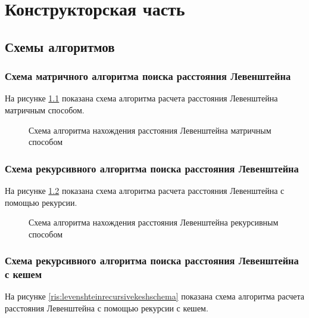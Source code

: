 
\chapter{Конструкторская часть}\label{Konstruct}

\section{Схемы алгоритмов}\label{SchemaAlg}


\subsection{Схема матричного алгоритма поиска расстояния Левенштейна}\label{SchemaMatrixLeventshein}

На рисунке \ref{ris:levenshteinmatrixschema} показана схема алгоритма расчета расстояния Левенштейна матричным способом.

\begin{figure}[H]
  \caption{Схема алгоритма нахождения расстояния Левенштейна матричным способом}
  \label{ris:levenshteinmatrixschema}
\end{figure}



\subsection{Схема рекурсивного алгоритма поиска расстояния Левенштейна}\label{SchemaRecursLeventshein}

На рисунке \ref{ris:levenshteinrecursiveschema} показана схема алгоритма расчета расстояния Левенштейна с помощью рекурсии.

\begin{figure}[H]
    \caption{Схема алгоритма нахождения расстояния Левенштейна рекурсивным способом}
    \label{ris:levenshteinrecursiveschema}
\end{figure}

\subsection{Схема рекурсивного алгоритма поиска расстояния Левенштейна с кешем}\label{SchemaRecursKeshLeventshein}

На рисунке \ref{ris:levenshteinrecursivekeshschema} показана схема алгоритма расчета расстояния Левенштейна с помощью рекурсии с кешем.

